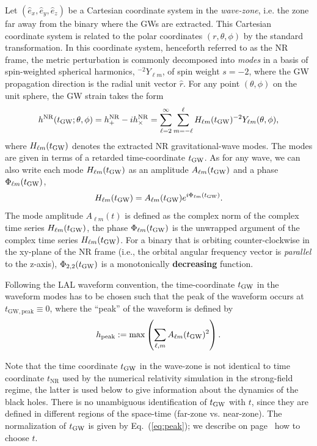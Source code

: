 \documentclass[11pt,tightenlines,article,amssymb,amsmath,amsfonts,superscriptaddress,nofootinbib]{revtex4}
\newcommand{\ExNR}{\hat e_x}
\newcommand{\EyNR}{\hat e_y}
\newcommand{\EzNR}{\hat e_z}
\newcommand{\tGW}{t_{\rm GW}}
\begin{document}
Let $( \ExNR, \EyNR, \EzNR)$ be a Cartesian coordinate system in the \emph{wave-zone}, i.e. the zone far away from the binary where the GWs are extracted. This Cartesian coordinate system is related to the polar coordinates $(r, \theta, \phi)$ by the standard transformation. In this coordinate system, henceforth referred to as the NR frame, the metric perturbation is commonly decomposed into \emph{modes}
in a basis of spin-weighted spherical harmonics, ${}^{-2}Y_{\ell m}$, of spin weight $s=-2$, where the GW propagation direction is the radial unit vector $\hat{r}$.
For any point $(\theta, \phi)$ on the unit sphere, the GW strain takes the form
\begin{equation}
\label{ }
h^\mathrm{NR}(\tGW; \theta, \phi) = h^\mathrm{NR}_+ - i h^\mathrm{NR}_\times = \sum_{\ell=2}^\infty \sum_{m=-\ell}^{\ell} H_{\ell m}(\tGW) {}^{-2}Y_{\ell m}(\theta,\phi),
\end{equation}
where $H_{\ell m}(\tGW)$ denotes the extracted NR gravitational-wave modes.
The modes are given in terms of a retarded time-coordinate
  $t_{\rm GW}$.
As for any wave, we can also write each mode $H_{\ell m}(\tGW)$ as an amplitude $A_{\ell m}(\tGW)$ and a phase
$\Phi_{\ell m}(\tGW)$,
\begin{equation}
\label{ }
H_{\ell m}(\tGW) = A_{\ell m}(\tGW)e^{i\Phi_{\ell m}(\tGW)}.
\end{equation}
The mode amplitude $A_{\ell m}(t)$ is defined as the complex norm of the complex time series $H_{\ell m}(\tGW)$, the phase $\Phi_{\ell m}(\tGW)$ is the unwrapped argument of the complex time series $H_{\ell m}(\tGW)$. For a binary that is orbiting counter-clockwise in the xy-plane of the NR frame (i.e., the orbital angular frequency vector is \emph{parallel} to the z-axis), $\Phi_{2,2}(\tGW)$ is a monotonically {\bf decreasing} function.

Following the LAL waveform convention, the time-coordinate $\tGW$ in the waveform modes has to be chosen such that the peak of the waveform occurs at $t_\mathrm{GW,peak} \equiv 0$, where the ``peak'' of the waveform is defined by
\begin{equation}
\label{eq:peak}
h_\mathrm{peak} := \max \left( \sum_{\ell, m} A_{\ell m}(\tGW)^2 \right).
\end{equation}

Note that the time coordinate $\tGW$ in the wave-zone is not
  identical to time coordinate $t_\mathrm{NR}$ used by the numerical
  relativity simulation in the strong-field regime, the latter is used
  below to give information about the dynamics of the black holes.  
  There is no unambiguous identification
  of $t_{\rm GW}$ with $t$, since they are defined in
  different regions of the space-time (far-zone vs. near-zone).  The
  normalization of $t_{\rm GW}$ is given by Eq.~(\ref{eq:peak}); we
  describe on page~\pageref{tGW-vs-tNR} how to choose $t$.
 
\end{document}
